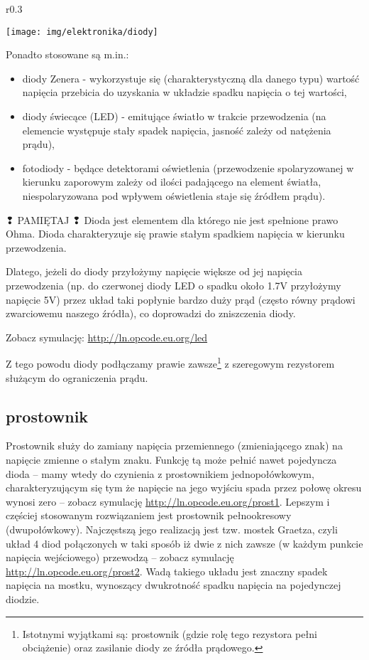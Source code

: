 \begin{wrapfigure}{r}{0.3\textwidth}
  \begin{center}
    \texttt{[image: img/elektronika/diody]}
  \end{center}
\end{wrapfigure}

\noindent
Ponadto stosowane są m.in.:
\begin{itemize}
\item diody Zenera - wykorzystuje się (charakterystyczną dla danego typu) wartość napięcia przebicia do uzyskania w układzie spadku napięcia o tej wartości,
\item diody świecące (LED) - emitujące światło w trakcie przewodzenia (na elemencie występuje stały spadek napięcia, jasność zależy od natężenia prądu),
\item fotodiody - będące detektorami oświetlenia (przewodzenie spolaryzowanej w kierunku zaporowym zależy od ilości padającego na element światła, niespolaryzowana pod wpływem oświetlenia staje się źródłem prądu).
\end{itemize}

\begin{ProTip}{{\Symbola ❢} PAMIĘTAJ {\Symbola ❢}}
Dioda jest elementem dla którego nie jest spełnione prawo Ohma. Dioda charakteryzuje się prawie stałym spadkiem napięcia w kierunku przewodzenia.

\vspace{5pt}
Dlatego, jeżeli do diody przyłożymy napięcie większe od jej napięcia przewodzenia (np. do czerwonej diody LED o spadku około 1.7V przyłożymy napięcie 5V) przez układ taki popłynie bardzo duży prąd (często równy prądowi zwarciowemu naszego źródła), co doprowadzi do zniszczenia diody.

Zobacz symulację: \url{http://ln.opcode.eu.org/led}

\vspace{5pt}
Z tego powodu diody podłączamy prawie zawsze\footnote{Istotnymi wyjątkami są: prostownik (gdzie rolę tego rezystora pełni obciążenie) oraz zasilanie diody ze źródła prądowego.} z szeregowym rezystorem służącym do ograniczenia prądu.
\end{ProTip}

\subsection{prostownik}

Prostownik służy do zamiany napięcia przemiennego (zmieniającego znak) na napięcie zmienne o stałym znaku.
Funkcję tą może pełnić nawet pojedyncza dioda – mamy wtedy do czynienia z prostownikiem jednopołówkowym,
	charakteryzującym się tym że napięcie na jego wyjściu spada przez połowę okresu wynosi zero – zobacz symulację \url{http://ln.opcode.eu.org/prost1}.
Lepszym i częściej stosowanym rozwiązaniem jest prostownik pełnookresowy (dwupołówkowy). Najczęstszą jego realizacją jest tzw. mostek Graetza, czyli układ 4 diod połączonych w taki sposób iż dwie z nich zawsze (w każdym punkcie napięcia wejściowego) przewodzą – zobacz symulację \url{http://ln.opcode.eu.org/prost2}.
Wadą takiego układu jest znaczny spadek napięcia na mostku, wynoszący dwukrotność spadku napięcia na pojedynczej diodzie.

